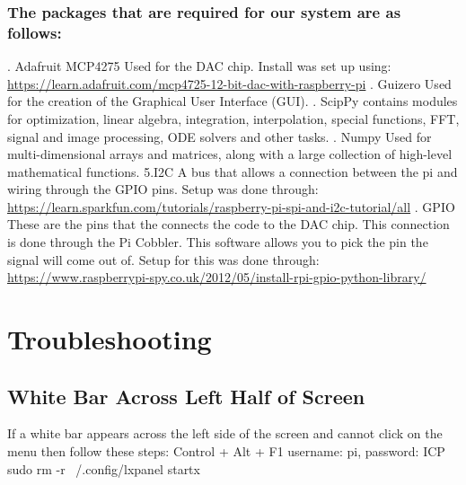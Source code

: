 \documentclass[12pt]{report}
\begin{document}
\subsubsection*{The packages that are required for our system are as follows:}
. Adafruit MCP4275
\newline
    Used for the DAC chip. Install was set up using: 
    \newline \url{https://learn.adafruit.com/mcp4725-12-bit-dac-with-raspberry-pi}
    \newline
{}. Guizero
\newline
    Used for the creation of the Graphical User Interface (GUI).
    \newline
{}. ScipPy
\newline
    contains modules for optimization, linear algebra, integration, interpolation, special functions, FFT, signal and image processing, ODE solvers and other tasks.
    \newline
{}. Numpy
\newline
    Used for multi-dimensional arrays and matrices, along with a large collection of high-level mathematical functions.
    \newline
\newline 5.I2C
\newline
    A bus that allows a connection between the pi and wiring through the GPIO pins. Setup was done through:
\newline  
\url{https://learn.sparkfun.com/tutorials/raspberry-pi-spi-and-i2c-tutorial/all}
\newline
{}. GPIO
\newline
    These are the pins that the connects the code to the DAC chip. This connection is done through the Pi Cobbler. This software allows you to pick the pin the signal will come out of. Setup for this was done through: 
\newline
\url{https://www.raspberrypi-spy.co.uk/2012/05/install-rpi-gpio-python-library/}

\section*{Troubleshooting}
\subsection*{White Bar Across Left Half of Screen}
If a white bar appears across the left side of the screen and cannot click on the menu then follow these steps:
\newline Control + Alt + F1
\newline username: pi, password: ICP
\newline sudo rm -r ~/.config/lxpanel
\newline startx
\end{document}
